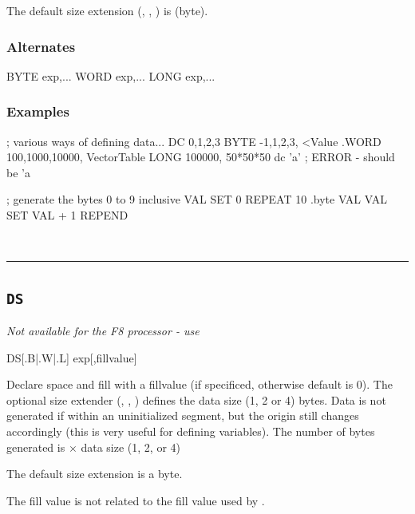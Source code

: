 The default size extension (, , ) is  (byte).

\subsubsection{Alternates}
\begin{usage}
   BYTE exp,...
   WORD exp,...
   LONG exp,...
\end{usage}

\subsubsection{Examples}

\begin{code}[caption=Data Generation]
; various ways of defining data...
  DC 0,1,2,3
  BYTE -1,1,2,3, <Value
  .WORD 100,1000,10000, VectorTable
  LONG 100000, 50*50*50
  dc 'a'  ; ERROR - should be 'a
\end{code}

\begin{code}[caption=Data Declaration using REPEAT Loop]
; generate the bytes 0 to 9 inclusive
VAL SET 0
    REPEAT 10
        .byte VAL
VAL SET VAL + 1
    REPEND
\end{code}\\




\hrule
\subsection{\texttt{DS}}
\label{pseudoop:ds}

\emph{Not available for the F8 processor - use }

\begin{usage}
  DS[{.B|.W|.L}] exp[,fillvalue]
\end{usage}

Declare space and fill with a fillvalue (if specificed, otherwise default is 0). The optional size extender (, , ) defines the data size (1, 2 or 4) bytes. Data is not generated if within an uninitialized segment, but the origin still changes accordingly (this is very useful for defining variables).  The number of bytes generated is  $\times$ data size (1, 2, or 4)

The default size extension is a byte.

The fill value is not related to the fill value used by .





